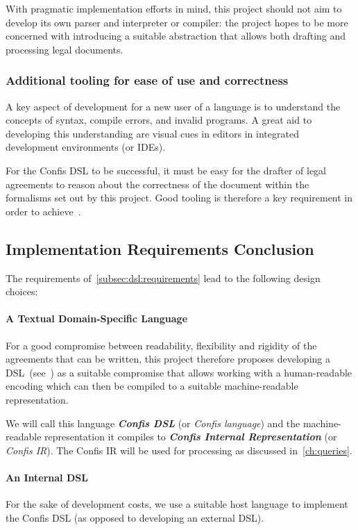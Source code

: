 With pragmatic implementation efforts in mind, this project should not aim to develop its own parser and interpreter or compiler: the project hopes to be more concerned with introducing a suitable abstraction that allows both drafting and processing legal documents.

\subsubsection{Additional tooling for ease of use and correctness}

A key aspect of development for a new user of a language is to understand the concepts of syntax, compile errors, and invalid programs.
A great aid to developing this understanding are visual cues in editors in integrated development environments (or IDEs).

For the Confis DSL to be successful, it must be easy for the drafter of legal agreements to reason about the correctness of the document within the formalisms set out by this project.
Good tooling is therefore a key requirement in order to achieve~.

\subsection{Implementation Requirements Conclusion}\label{subsec:dsl-design-conclusion}

The requirements of~\autoref{subsec:dsl:requirements} lead to the following design choices:

\paragraph{A Textual Domain-Specific Language} For a good compromise between readability, flexibility and rigidity of the agreements that can be written, this project therefore proposes developing a DSL~(see~) as a suitable compromise that allows working with a human-readable encoding which can then be compiled to a suitable machine-readable representation.

We will call this language \textbf{\emph{Confis DSL}} (or \emph{Confis language}) and the machine-readable representation it compiles to \textbf{\emph{Confis Internal Representation}} (or \emph{Confis IR}).
The Confis IR will be used for processing as discussed in~\autoref{ch:queries}.

\paragraph{An Internal DSL}
For the sake of development costs, we use a suitable host language to implement the Confis DSL (as opposed to developing an external DSL).

